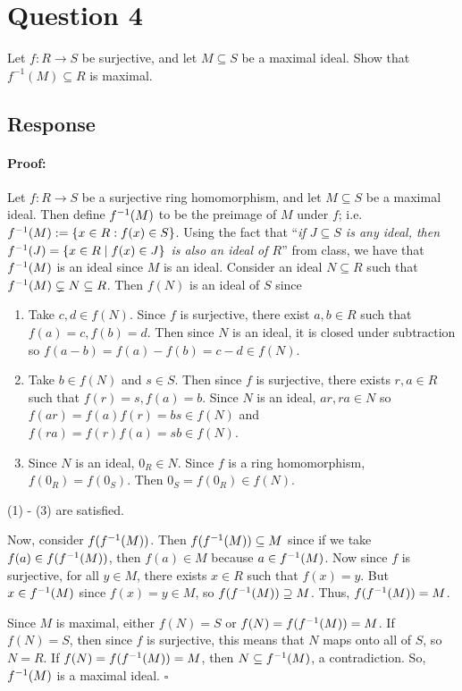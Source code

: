 \documentclass [12pt] {article}
\newenvironment{proof}{\paragraph{Proof:}}{\hfill$\square$}
\begin{document}
\newpage
\section*{Question 4}
Let $f:R\to S$ be surjective, and let $M\subseteq S$ be a maximal ideal. Show that $f^{-1}(M)\subseteq R$ is maximal. 
\subsection*{Response}
\begin{proof}
Let $f : R \to S$ be a surjective ring homomorphism, and let $M \subseteq S$ be a maximal ideal.
Then define $f^{-1}(M)$ to be the preimage of $M$ under $f$; i.e. $f^{-1}(M) := \{x \in R : f(x) \in S\}$.
Using the fact that ``\textit{if $J \subseteq S$ is any ideal, then $f^{-1}(J) = \{x \in R \mid f(x) \in J\}$
is also an ideal of $R$}'' from class, we have that $f^{-1}(M)$ is an ideal since $M$ is an ideal. 
Consider an ideal $N \subseteq R$ such that $f^{-1}(M) \subsetneq N \subseteq R$. Then $f(N)$ is an 
ideal of $S$ since
\begin{enumerate}
    \item Take $c, d \in f(N)$. Since $f$ is surjective, there exist $a, b \in R$ such that
        $f(a) = c, f(b) = d$. Then since $N$ is an ideal, it is closed under subtraction so
        $f(a - b) = f(a) - f(b) = c - d \in f(N)$.
    \item Take $b \in f(N)$ and $s \in S$. Then since $f$ is surjective, there exists
        $r, a \in R$ such that $f(r) = s, f(a) = b$. Since $N$ is an ideal, $ar, ra \in N$ so 
        $f(ar) = f(a)f(r) = bs \in f(N)$ and $f(ra) = f(r)f(a) = sb \in f(N)$.
    \item Since $N$ is an ideal, $0_R \in N$. Since $f$ is a ring homomorphism, $f(0_R) = f(0_S)$. Then
        $0_S = f(0_R) \in f(N)$.
\end{enumerate}
(1) - (3) are satisfied. 
\vspace{1em}

Now, consider $f(f^{-1}(M))$. Then $f(f^{-1}(M)) \subseteq M$ since if we take
$f(a) \in f(f^{-1}(M))$, then $f(a) \in M$ because $a \in f^{-1}(M)$. Now since $f$ is surjective,
for all $y \in M$, there exists $x \in R$ such that $f(x) = y$. But $x \in f^{-1}(M)$ since 
$f(x) = y \in M$, so $f(f^{-1}(M)) \supseteq M$. Thus, $f(f^{-1}(M)) = M$.
\vspace{1em}

Since $M$ is maximal, either $f(N) = S$ or $f(N) = f(f^{-1}(M)) = M$. If $f(N) = S$, then
since $f$ is surjective, this means that $N$ maps onto all of $S$, so $N = R$.
If $f(N) = f(f^{-1}(M)) = M$, then $N \subseteq f^{-1}(M)$, a contradiction. So, $f^{-1}(M)$ is a maximal ideal.
\end{proof}
\end{document}
